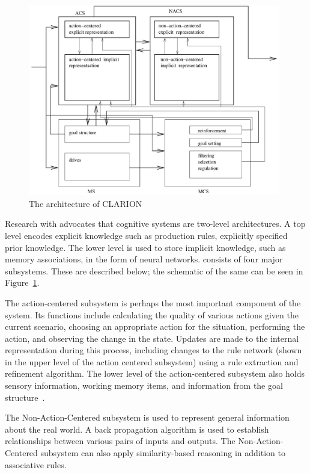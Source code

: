 \begin{figure}[htp]
  \centering
  \includegraphics[width=110mm]{CLARION.eps}
  \caption{The architecture of CLARION \cite{citeulike:3439185}}
  \label{CLARION_ARCH}
\end{figure}
Research with \clarion advocates that cognitive systems are two-level
architectures.  A top level encodes explicit knowledge
such as production rules, explicitly specified prior knowledge. The
lower level is used to store implicit knowledge, such as memory
associations, in the form of neural networks. \clarion consists of four
major subsystems.  These are described below; the schematic of the same
can be seen in Figure~\ref{CLARION_ARCH}.

The action-centered subsystem is perhaps the most important component
of the system. Its functions include calculating the quality of
various actions given the current scenario, choosing an appropriate
action for the situation, performing the action, and observing the
change in the state.  Updates are made to the internal representation
during this process, including changes to the rule network (shown in
the upper level of the action centered subsystem) using a rule
extraction and refinement algorithm. The lower level of the
action-centered subsystem also holds sensory information, working
memory items, and information from the goal
structure~\cite{Sun:2003aa}.

The Non-Action-Centered subsystem is used to represent general
information about the real world. A back propagation algorithm is used
to establish relationships between various pairs of inputs and
outputs. The Non-Action-Centered subsystem can also apply
similarity-based reasoning in addition to associative rules.

